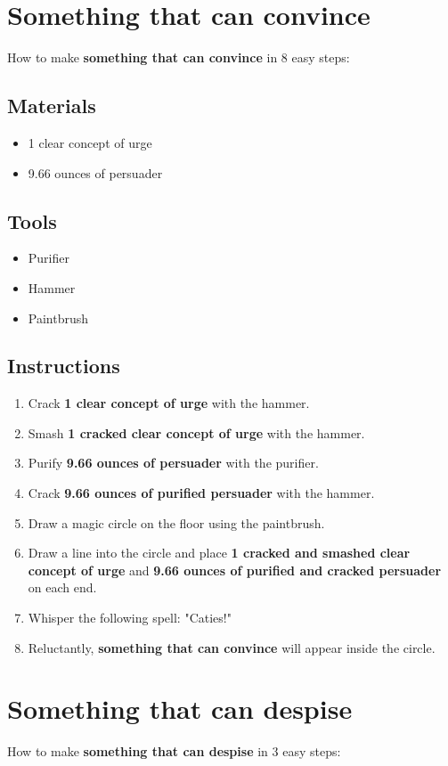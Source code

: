 \documentclass{article}
\begin{document}
\section{Something that can convince}How to make \textbf{something that can convince} in 8 easy steps:

\subsection{Materials}\begin{itemize}
\item 
1 clear concept of urge
\item 
9.66 ounces of persuader
\end{itemize}
\subsection{Tools}\begin{itemize}
\item 
Purifier
\item 
Hammer
\item 
Paintbrush
\end{itemize}
\subsection{Instructions}\begin{enumerate}
\item 
Crack \textbf{1 clear concept of urge} with the hammer.
\item 
Smash \textbf{1 cracked clear concept of urge} with the hammer.
\item 
Purify \textbf{9.66 ounces of persuader} with the purifier.
\item 
Crack \textbf{9.66 ounces of purified persuader} with the hammer.
\item 
Draw a magic circle on the floor using the paintbrush.
\item 
Draw a line into the circle and place \textbf{1 cracked and smashed clear concept of urge} and \textbf{9.66 ounces of purified and cracked persuader} on each end.
\item 
Whisper the following spell: "Caties!"
\item 
Reluctantly, \textbf{something that can convince} will appear inside the circle.
\end{enumerate}
\newpage
\section{Something that can despise}How to make \textbf{something that can despise} in 3 easy steps:
\end{document}
